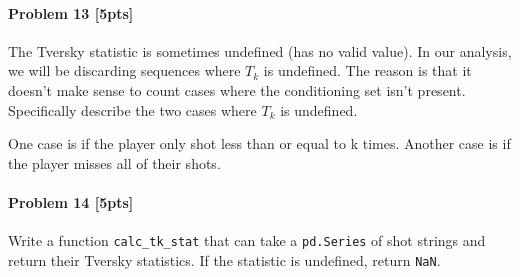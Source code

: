 \documentclass[11pt]{article}
\begin{document}
\paragraph{Problem 13 {[}5pts{]}}\label{problem-13-5pts}

The Tversky statistic is sometimes undefined (has no valid value). In
our analysis, we will be discarding sequences where \(T_k\) is
undefined. The reason is that it doesn't make sense to count cases where
the conditioning set isn't present. Specifically describe the two cases
where \(T_k\) is undefined.

    One case is if the player only shot less than or equal to k times.
Another case is if the player misses all of their shots.

    \paragraph{Problem 14 {[}5pts{]}}\label{problem-14-5pts}

Write a function \texttt{calc\_tk\_stat} that can take a
\texttt{pd.Series} of shot strings and return their Tversky statistics.
If the statistic is undefined, return \texttt{NaN}.
\end{document}
